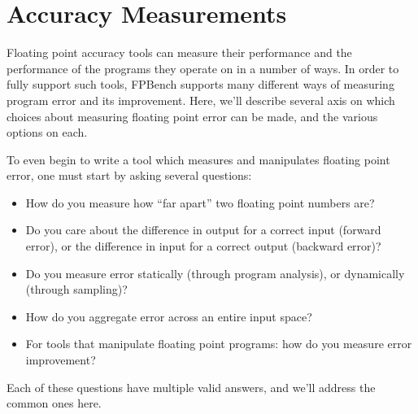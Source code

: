 \documentclass[main.tex]{subfiles}
\begin{document}
\section{Accuracy Measurements}
\label{sec:measure}

Floating point accuracy tools can measure their performance and the
performance of the programs they operate on in a number of ways. In
order to fully support such tools, FPBench supports many different
ways of measuring program error and its improvement. Here, we'll
describe several axis on which choices about measuring floating point
error can be made, and the various options on each.

To even begin to write a tool which measures and manipulates floating
point error, one must start by asking several questions:

\begin{itemize}
\item How do you measure how ``far apart''  two floating point
  numbers are?
\item Do you care about the difference in output for a correct input
  (forward error), or the difference in input for a correct output
  (backward error)?
\item Do you measure error statically (through program analysis), or
  dynamically (through sampling)?
\item How do you aggregate error across an entire input space?
\item For tools that manipulate floating point programs: how do you
  measure error improvement?
\end{itemize}

Each of these questions have multiple valid answers, and we'll address
the common ones here.
\end{document}
